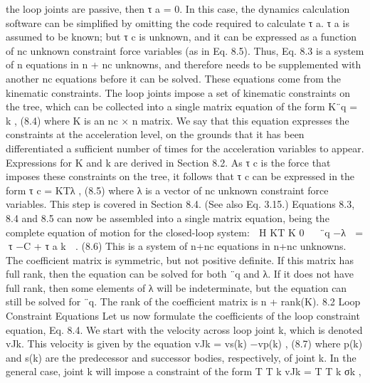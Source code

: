 the loop joints are passive, then τ a = 0. In this case, the dynamics calculation software can be simplified by omitting the code required to calculate τ a. τ a is assumed to be known; but τ c is unknown, and it can be expressed as a function of nc unknown constraint force variables (as in Eq. 8.5). Thus, Eq. 8.3 is a system of n equations in n + nc unknowns, and therefore needs to be supplemented with another nc equations before it can be solved. These equations come from the kinematic constraints. The loop joints impose a set of kinematic constraints on the tree, which can be collected into a single matrix equation of the form K¨q = k , (8.4) where K is an nc × n matrix. We say that this equation expresses the constraints at the acceleration level, on the grounds that it has been differentiated a sufficient number of times for the acceleration variables to appear. Expressions for K and k are derived in Section 8.2. As τ c is the force that imposes these constraints on the tree, it follows that τ c can be expressed in the form τ c = KTλ , (8.5) where λ is a vector of nc unknown constraint force variables. This step is covered in Section 8.4. (See also Eq. 3.15.) Equations 8.3, 8.4 and 8.5 can now be assembled into a single matrix equation, being the complete equation of motion for the closed-loop system:  H KT K 0   ¨q −λ  = τ −C + τ a k  . (8.6) This is a system of n+nc equations in n+nc unknowns. The coefficient matrix is symmetric, but not positive definite. If this matrix has full rank, then the equation can be solved for both ¨q and λ. If it does not have full rank, then some elements of λ will be indeterminate, but the equation can still be solved for ¨q. The rank of the coefficient matrix is n + rank(K). 8.2 Loop Constraint Equations Let us now formulate the coefficients of the loop constraint equation, Eq. 8.4. We start with the velocity across loop joint k, which is denoted vJk. This velocity is given by the equation vJk = vs(k) −vp(k) , (8.7) where p(k) and s(k) are the predecessor and successor bodies, respectively, of joint k. In the general case, joint k will impose a constraint of the form T T k vJk = T T k σk ,


